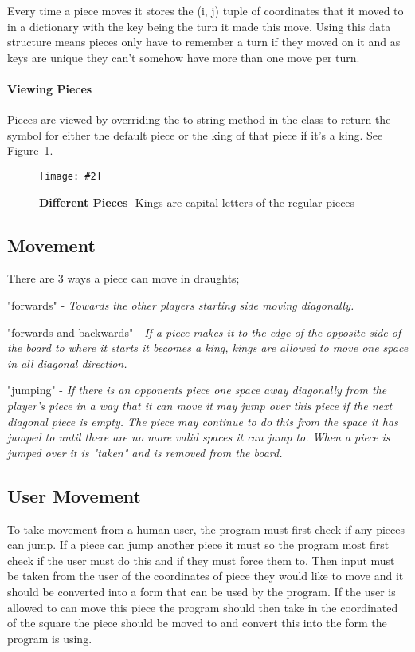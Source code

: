 \documentclass[10pt, a4paper]{article}
\newcommand{\figuremacro}[5]{
    \begin{figure}[#1]
        \centering
        \texttt{[image: \#2]}
        \caption[#3]{\textbf{#3}#4}
        \label{fig:#2}
    \end{figure}
}
\begin{document}
    Every time a piece moves it stores the (i, j) tuple of coordinates that it moved to in a dictionary with the key being the turn it made this move. Using this data structure means pieces only have to remember a turn if they moved on it and as keys are unique they can't somehow have more than one move per turn.
    
    \paragraph{Viewing Pieces}
    Pieces are viewed by overriding the to string method in the class to return the symbol for either the default piece or the king of that piece if it's a king. See Figure~\ref{fig:Pieces}.
    
    \figuremacro{h}{Pieces}{Different Pieces}{- Kings are capital letters of the regular pieces}{1.0}
    
    \subsection{Movement}
    There are 3 ways a piece can move in draughts;
    
    "forwards" - \textit{Towards the other players starting side moving diagonally.}
    
    "forwards and backwards" - \textit{If a piece makes it to the edge of the opposite side of the board to where it starts it becomes a king, kings are allowed to move one space in all diagonal direction.}
    
    "jumping" - \textit{If there is an opponents piece one space away diagonally from the player's piece in a way that it can move it may jump over this piece if the next diagonal piece is empty. The piece may continue to do this from the space it has jumped to until there are no more valid spaces it can jump to. When a piece is jumped over it is "taken" and is removed from the board.}
    
    \subsection{User Movement}
    To take movement from a human user, the program must first check if any pieces can jump. If a piece can jump another piece it must so the program most first check if the user must do this and if they must force them to. Then input must be taken from the user of the coordinates of piece they would like to move and it should be converted into a form that can be used by the program. If the user is allowed to can move this piece the program should then take in the coordinated of the square the piece should be moved to and convert this into the form the program is using.
    
\end{document}

